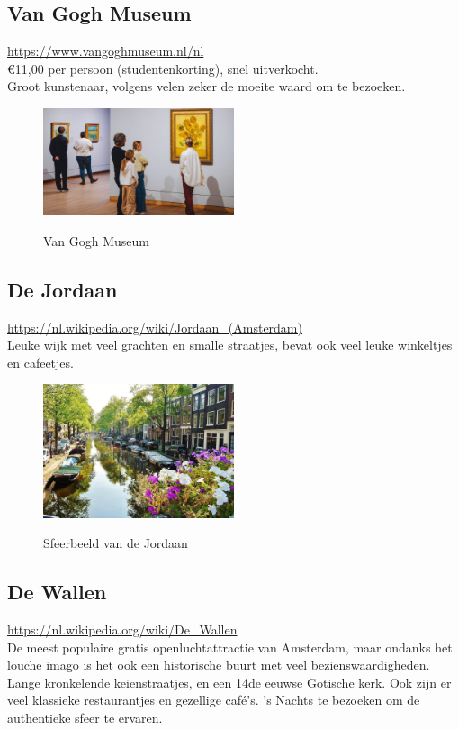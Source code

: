 \documentclass[a4paper, 12pt]{article}
\begin{document}
\subsection{Van Gogh Museum}
\url{https://www.vangoghmuseum.nl/nl}\\
€11,00 per persoon (studentenkorting), snel uitverkocht.\\
Groot kunstenaar, volgens velen zeker de moeite waard om te bezoeken.

\begin{figure}[h]
    \centering
    \includegraphics[width=0.5\textwidth]{vangogh_museum.jpg}\label{fig:vangogh}
    \caption{Van Gogh Museum}
\end{figure}

\subsection{De Jordaan}
\url{https://nl.wikipedia.org/wiki/Jordaan_(Amsterdam)}\\
Leuke wijk met veel grachten en smalle straatjes, bevat ook veel leuke winkeltjes en cafeetjes.

\begin{figure}[h]
    \centering
    \includegraphics[width=0.5\textwidth]{jordaan-amsterdam.jpg}\label{fig:jordaan}
    \caption{Sfeerbeeld van de Jordaan}
\end{figure}

\subsection{De Wallen}
\url{https://nl.wikipedia.org/wiki/De_Wallen}\\
De meest populaire gratis openluchtattractie van Amsterdam, 
maar ondanks het louche imago is het ook een historische buurt met veel bezienswaardigheden.
Lange kronkelende keienstraatjes, en een 14de eeuwse Gotische kerk.
Ook zijn er veel klassieke restaurantjes en gezellige café's.
's Nachts te bezoeken om de authentieke sfeer te ervaren.
\end{document}
